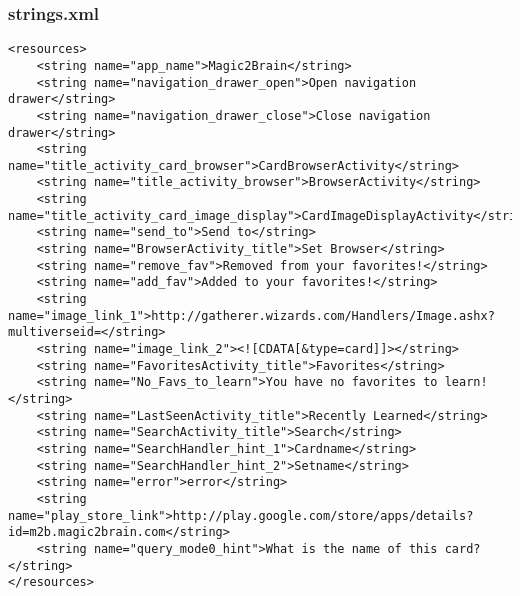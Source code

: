 \subsubsection{strings.xml}
\begin{lstlisting}
<resources>
    <string name="app_name">Magic2Brain</string>
    <string name="navigation_drawer_open">Open navigation drawer</string>
    <string name="navigation_drawer_close">Close navigation drawer</string>
    <string name="title_activity_card_browser">CardBrowserActivity</string>
    <string name="title_activity_browser">BrowserActivity</string>
    <string name="title_activity_card_image_display">CardImageDisplayActivity</string>
    <string name="send_to">Send to</string>
    <string name="BrowserActivity_title">Set Browser</string>
    <string name="remove_fav">Removed from your favorites!</string>
    <string name="add_fav">Added to your favorites!</string>
    <string name="image_link_1">http://gatherer.wizards.com/Handlers/Image.ashx?multiverseid=</string>
    <string name="image_link_2"><![CDATA[&type=card]]></string>
    <string name="FavoritesActivity_title">Favorites</string>
    <string name="No_Favs_to_learn">You have no favorites to learn!</string>
    <string name="LastSeenActivity_title">Recently Learned</string>
    <string name="SearchActivity_title">Search</string>
    <string name="SearchHandler_hint_1">Cardname</string>
    <string name="SearchHandler_hint_2">Setname</string>
    <string name="error">error</string>
    <string name="play_store_link">http://play.google.com/store/apps/details?id=m2b.magic2brain.com</string>
    <string name="query_mode0_hint">What is the name of this card?</string>
</resources>
\end{lstlisting}

